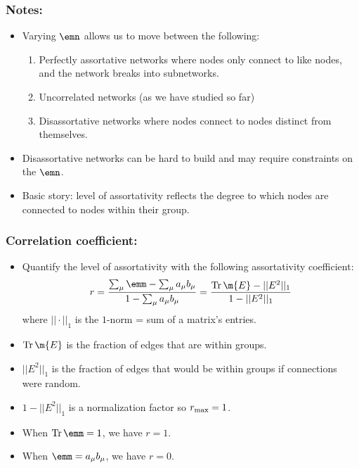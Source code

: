 \begin{frame}
  \frametitle{Notes:}

  \begin{itemize}
  \item<1-> Varying $\emn$ allows us to move
    between the following:
    \begin{enumerate}
    \item<2-> 
      \alert{Perfectly assortative networks} where
      nodes only connect to like nodes, and the
      network breaks into subnetworks.\\
    \item<4->
      \alert{Uncorrelated networks} (as we have studied so far)\\
    \item<6->
      \alert{Disassortative networks} where nodes connect
      to nodes distinct from themselves.
    \end{enumerate}
  \item<7->
    Disassortative networks can be hard to build
    and may require constraints on the $\emn$.
  \item<8->
    Basic story: level of assortativity reflects
    the degree to which nodes are connected to
    nodes within their group.
  \end{itemize}

\end{frame}

\begin{frame}
  \frametitle{Correlation coefficient:}

  \begin{itemize}
  \item Quantify the level of assortativity
    with the following \alert{assortativity coefficient}\cite{newman2003e}:
    $$
    r = 
    \frac{
      \sum_{\mu} \emm - \sum_{\mu} a_{\mu} b_{\mu}
      }
    {
      1 - \sum_{\mu} a_{\mu} b_{\mu}
    }
    =
    \frac{
      {\rm Tr} \, \m{E} - || E^2 ||_1
    }
    {
      1 - || E^2 ||_1
    }
    $$
    where $|| \cdot ||_1$ is the $1$-norm = sum of a matrix's entries.
  \item<2->
    ${\rm Tr} \, \m{E}$ is the fraction of edges that are within groups.
  \item<3->
    $|| E^2 ||_1$ is the fraction of edges that would be within
    groups if connections were random.
  \item<4->
    $1 - || E^2 ||_1$ is a normalization factor so $r_{\rm max} = 1$.
  \item<5->
    When $\rm{Tr}\, \emm = 1$, we have $r=1$. \alert{\checkmark}
  \item<6->
    When $\emm = a_{\mu} b_{\mu}$, we have $r=0$. \alert{\checkmark}
  \end{itemize}

\end{frame}

